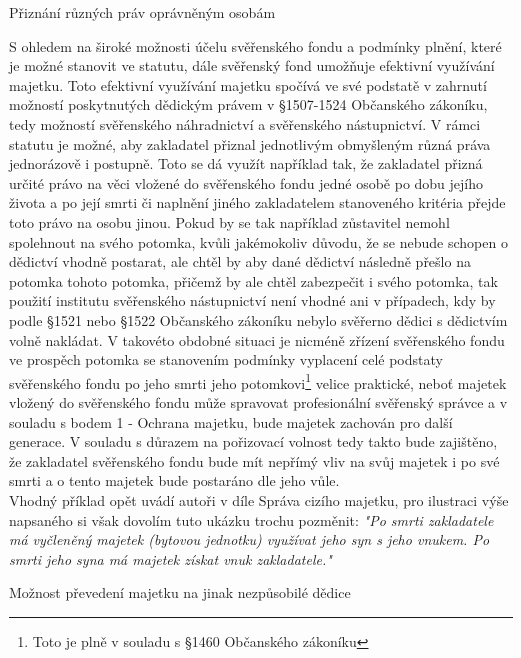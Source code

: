 \documentclass{article}
\begin{document}
  \begin{enumerate}
 {\Large\item[6.] Přiznání různých práv oprávněným osobám}
 \end{enumerate}
 
 S ohledem na široké možnosti účelu svěřenského fondu a podmínky plnění, které je možné stanovit ve statutu, dále svěřenský fond umožňuje efektivní využívání majetku. Toto efektivní využívání majetku spočívá ve své podstatě v zahrnutí možností poskytnutých dědickým právem v §1507-1524 Občanského zákoníku, tedy možností svěřenského náhradnictví a svěřenského nástupnictví. V rámci statutu je možné, aby zakladatel přiznal jednotlivým obmyšleným různá práva jednorázově i postupně. Toto se dá využít například tak, že zakladatel přizná určité právo na věci vložené do svěřenského fondu jedné osobě po dobu jejího života a po její smrti či naplnění jiného zakladatelem stanoveného kritéria přejde toto právo na osobu jinou. Pokud by se tak například zůstavitel nemohl spolehnout na svého potomka, kvůli jakémokoliv důvodu, že se nebude schopen o dědictví vhodně postarat, ale chtěl by aby dané dědictví následně přešlo na potomka tohoto potomka, přičemž by ale chtěl zabezpečit i svého potomka, tak použití institutu svěřenského nástupnictví není vhodné ani v případech, kdy by podle §1521 nebo §1522 Občanského zákoníku nebylo svěřerno dědici s dědictvím volně nakládat. V takovéto obdobné situaci je nicméně zřízení svěřenského fondu ve prospěch potomka se stanovením podmínky vyplacení celé podstaty svěřenského fondu po jeho smrti jeho potomkovi\footnote{Toto je plně v souladu s §1460 Občanského zákoníku} velice praktické, neboť majetek vložený do svěřenského fondu může spravovat profesionální svěřenský správce a v souladu s bodem 1 - Ochrana majetku, bude majetek zachován pro další generace. V souladu s důrazem na pořizovací volnost tedy takto bude zajištěno, že zakladatel svěřenského fondu bude mít nepřímý vliv na svůj majetek i po své smrti a o tento majetek bude postaráno dle jeho vůle.\\
 
 Vhodný příklad opět uvádí autoři v díle Správa cizího majetku, pro ilustraci výše napsaného si však dovolím tuto ukázku trochu pozměnit: \textit{"Po smrti zakladatele má vyčleněný majetek (bytovou jednotku) využívat jeho syn s jeho vnukem. Po smrti jeho syna má majetek získat vnuk zakladatele."}
 
   \begin{enumerate}
 {\Large\item[6.] Možnost převedení majetku na jinak nezpůsobilé dědice}
 \end{enumerate}
\end{document}
